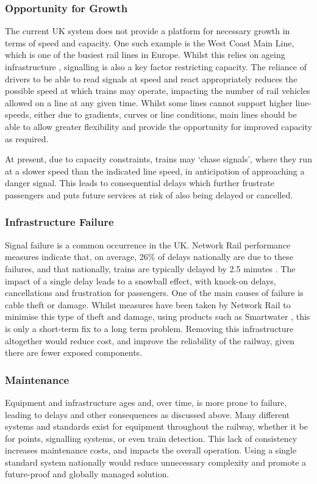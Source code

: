 \documentclass[twoside,11pt,a4paper]{article}
\begin{document}
\subsubsection{Opportunity for Growth}
The current UK system does not provide a platform for necessary growth in terms of speed and capacity. One such example is the West Coast Main Line, which is one of the busiest \citep[pp. 2]{Parliament10a} rail lines in Europe. Whilst this relies on ageing infrastructure \citep{NetworkRail09a}, signalling is also a key factor restricting capacity. The reliance of drivers to be able to read signals at speed and react appropriately reduces the possible speed at which trains may operate, impacting the number of rail vehicles allowed on a line at any given time. Whilst some lines cannot support higher line-speeds, either due to gradients, curves or line conditions, main lines should be able to allow greater flexibility and provide the opportunity for improved capacity as required.

At present, due to capacity constraints, trains may `chase signals', where they run at a slower speed than the indicated line speed, in anticipation of approaching a danger signal. This leads to consequential delays which further frustrate passengers and puts future services at risk of also being delayed or cancelled.

\subsubsection{Infrastructure Failure}
Signal failure is a common occurrence in the UK. Network Rail performance measures indicate that, on average, 26\% of delays nationally are due to these failures, and that nationally, trains are typically delayed by 2.5 minutes \citep{NetworkRail15e}. The impact of a single delay leads to a snowball effect, with knock-on delays, cancellations and frustration for passengers. One of the main causes of failure is cable theft or damage. Whilst measures have been taken by Network Rail to minimise this type of theft and damage, using products such as Smartwater \citep{SmartWater15a}, this is only a short-term fix to a long term problem. Removing this infrastructure altogether would reduce cost, and improve the reliability of the railway, given there are fewer exposed components.

\subsubsection{Maintenance}
Equipment and infrastructure ages and, over time, is more prone to failure, leading to delays and other consequences as discussed above. Many different systems and standards exist for equipment throughout the railway, whether it be for points, signalling systems, or even train detection. This lack of consistency increases maintenance costs, and impacts the overall operation. Using a single standard system nationally would reduce unnecessary complexity and promote a future-proof and globally managed solution.
\end{document}
